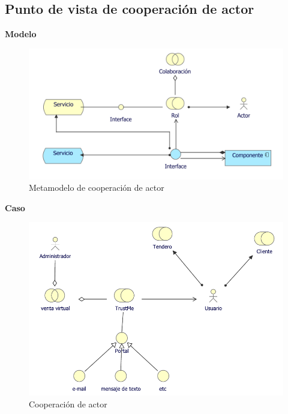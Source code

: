 	\subsection{Punto de vista de cooperación de actor}
	{ 
		
		\textbf{Modelo}\\
		\begin{figure}[H]
			\centering
			\includegraphics[width=0.8\linewidth]{development/cooperacionactor.png}
			\caption{Metamodelo de cooperación de actor}
		\end{figure}
		
		\textbf{Caso}\\
		
		\begin{figure}[H]
			\centering
			\includegraphics[width=0.8\linewidth]{development/cooperacionactor.pdf}
			\caption{Cooperación de actor}
		\end{figure}
	}
	
